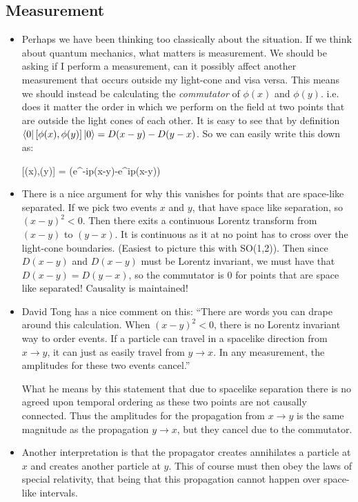 \documentclass[11pt]{article}
\renewenvironment{flalign}{\vspace{-2mm}\empheq[box=\tcbhighmath]{align}}{\endempheq}
\numberwithin{equation}{section}
\begin{document}
\subsection{Measurement}
\begin{itemize}
  \item Perhaps we have been thinking too classically about the situation. If we think about quantum mechanics, what matters is measurement. We should be asking if I perform a measurement, can it possibly affect another measurement that occurs outside my light-cone and visa versa. This means we should instead be calculating the \emph{commutator} of $\phi(x)$ and $\phi(y)$. i.e. does it matter the order in which we perform on the field at two points that are outside the light cones of each other. It is easy to see that by definition $\bra{0}[\phi(x),\phi(y)]\ket{0} = D(x-y)-D(y-x)$. So we can easily write this down as:

  \begin{flalign}
  \label{KG_prop}
    [\phi(x),\phi(y)] = \int {} \left(e^{-ip(x-y)}-e^{ip(x-y)}\right)
    \end{flalign} 
  
  \item There is a nice argument for why this vanishes for points that are space-like separated. If we pick two events $x$ and $y$, that have space like separation, so $(x-y)^2 < 0$. Then there exits a continuous Lorentz transform from $(x-y)$ to $(y-x)$. It is continuous as it at no point has to cross over the light-cone boundaries. (Easiest to picture this with SO(1,2)). Then since $D(x-y)$ and $D(x-y)$ must be Lorentz invariant, we must have that $D(x-y)=D(y-x)$, so the commutator is $0$ for points that are space like separated! Causality is maintained!  

      \item David Tong has a nice comment on this: ``There are words you can drape around this calculation. When $(x-y)^2<0$, there is no Lorentz invariant way to order events. If a particle can travel in a spacelike direction from $x \rightarrow y$, it can just as easily travel from $y \rightarrow x$. In any measurement, the amplitudes for these two events cancel.''  

      What he means by this statement that due to spacelike separation there is no agreed upon temporal ordering as these two points are not causally connected. Thus the amplitudes for the propagation from $x \rightarrow y$ is the same magnitude as the propagation $y \rightarrow x$, but they cancel due to the commutator.  

      \item  Another interpretation is that the propagator creates annihilates a particle at $x$ and creates another particle at $y$. This of course must then obey the laws of special relativity, that being that this propagation cannot  happen over space-like intervals.  
\end{itemize}
\end{document}
